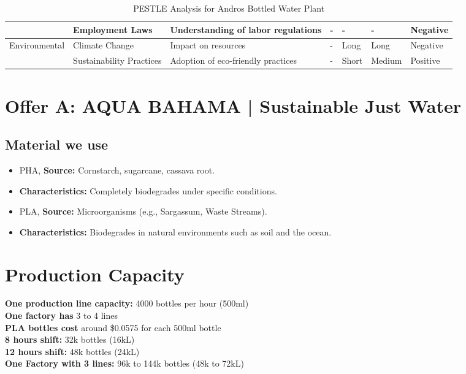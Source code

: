 \documentclass{article}
\begin{document}
\begin{itemize}
\begin{table}[H]
\begin{tabular}{|m{2cm}|m{2cm}|m{3cm}|m{1.5cm}|m{1.5cm}|m{1.5cm}|m{2cm}|}
\cline{2-7} 
& Employment Laws & Understanding of labor regulations & - & - & - & Negative \\
\hline 
\multirow{2}{=}{Environmental} & Climate Change & Impact on resources & - & Long & Long & Negative \\
\cline{2-7} 
& Sustainability Practices & Adoption of eco-friendly practices & - & Short & Medium & Positive \\
\hline
\end{tabular}
\caption{PESTLE Analysis for Andros Bottled Water Plant}
\end{table}
\end{itemize}


\section{Offer A: AQUA BAHAMA | Sustainable Just Water}
\subsection*{Material we use}
\begin{itemize}
    \item PHA, \textbf{Source:} Cornstarch, sugarcane, cassava root.
    \item \textbf{Characteristics:} Completely biodegrades under specific conditions.
\end{itemize}

\begin{itemize}
    \item PLA, \textbf{Source:} Microorganisms (e.g., Sargassum, Waste Streams).
    \item \textbf{Characteristics:} Biodegrades in natural environments such as soil and the ocean.
\end{itemize}
\section*{Production Capacity}

\textbf{One production line capacity:} 4000 bottles per hour (500ml) \\
\textbf{One factory has} 3 to 4 lines \\
\textbf{PLA bottles cost} around \$0.0575 for each 500ml bottle \\
\textbf{8 hours shift:} 32k bottles (16kL) \\
\textbf{12 hours shift:} 48k bottles (24kL) \\
\textbf{One Factory with 3 lines:} 96k to 144k bottles (48k to 72kL) \\
\end{document}
